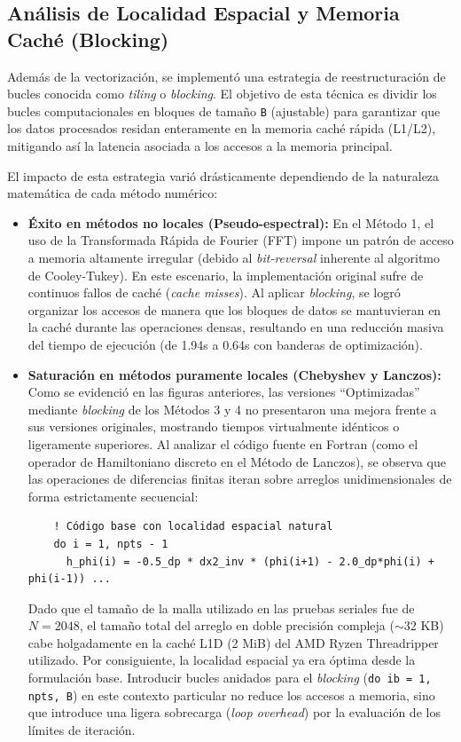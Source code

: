 \documentclass[12pt, a4paper]{article}
\begin{document}
\subsection{Análisis de Localidad Espacial y Memoria Caché (Blocking)}
\label{sec:cache_analysis}

Además de la vectorización, se implementó una estrategia de reestructuración de bucles conocida como \textit{tiling} o \textit{blocking}. El objetivo de esta técnica es dividir los bucles computacionales en bloques de tamaño \texttt{B} (ajustable) para garantizar que los datos procesados residan enteramente en la memoria caché rápida (L1/L2), mitigando así la latencia asociada a los accesos a la memoria principal.

El impacto de esta estrategia varió drásticamente dependiendo de la naturaleza matemática de cada método numérico:

\begin{itemize}
    \item \textbf{Éxito en métodos no locales (Pseudo-espectral):} En el Método 1, el uso de la Transformada Rápida de Fourier (FFT) impone un patrón de acceso a memoria altamente irregular (debido al \textit{bit-reversal} inherente al algoritmo de Cooley-Tukey). En este escenario, la implementación original sufre de continuos fallos de caché (\textit{cache misses}). Al aplicar \textit{blocking}, se logró organizar los accesos de manera que los bloques de datos se mantuvieran en la caché durante las operaciones densas, resultando en una reducción masiva del tiempo de ejecución (de 1.94s a 0.64s con banderas de optimización).
    
    \item \textbf{Saturación en métodos puramente locales (Chebyshev y Lanczos):} Como se evidenció en las figuras anteriores, las versiones ``Optimizadas'' mediante \textit{blocking} de los Métodos 3 y 4 no presentaron una mejora frente a sus versiones originales, mostrando tiempos virtualmente idénticos o ligeramente superiores. Al analizar el código fuente en Fortran (como el operador de Hamiltoniano discreto en el Método de Lanczos), se observa que las operaciones de diferencias finitas iteran sobre arreglos unidimensionales de forma estrictamente secuencial:
    
    \begin{verbatim}
    ! Código base con localidad espacial natural
    do i = 1, npts - 1
      h_phi(i) = -0.5_dp * dx2_inv * (phi(i+1) - 2.0_dp*phi(i) + phi(i-1)) ...
    \end{verbatim}
    
    Dado que el tamaño de la malla utilizado en las pruebas seriales fue de $N=2048$, el tamaño total del arreglo en doble precisión compleja ($\sim 32$ KB) cabe holgadamente en la caché L1D (2 MiB) del AMD Ryzen Threadripper utilizado. Por consiguiente, la localidad espacial ya era óptima desde la formulación base. Introducir bucles anidados para el \textit{blocking} (\texttt{do ib = 1, npts, B}) en este contexto particular no reduce los accesos a memoria, sino que introduce una ligera sobrecarga (\textit{loop overhead}) por la evaluación de los límites de iteración. 
\end{itemize}
\end{document}
